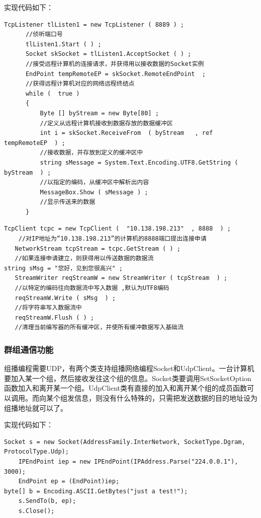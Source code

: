 \documentclass[UTF8,12pt]{article}
\begin{document}
实现代码如下：
\begin{lstlisting}[title=利用Socket来接收信息,frame=shadowbox]
    TcpListener tlListen1 = new TcpListener ( 8889 ) ;
      //侦听端口号
      tlListen1.Start ( ) ;
      Socket skSocket = tlListen1.AcceptSocket ( ) ;
      //接受远程计算机的连接请求，并获得用以接收数据的Socket实例
      EndPoint tempRemoteEP = skSocket.RemoteEndPoint  ;
      //获得远程计算机对应的网络远程终结点
      while (  true )
      {
          Byte [] byStream = new Byte[80] ;
          //定义从远程计算机接收到数据存放的数据缓冲区
          int i = skSocket.ReceiveFrom  ( byStream   , ref tempRemoteEP  ) ;
          //接收数据，并存放到定义的缓冲区中
          string sMessage = System.Text.Encoding.UTF8.GetString ( byStream  ) ;
          //以指定的编码，从缓冲区中解析出内容
          MessageBox.Show ( sMessage ) ;
          //显示传送来的数据
      }
\end{lstlisting}

\begin{lstlisting}[title=利用NetworkStream来发送信息,frame=shadowbox]
    TcpClient tcpc = new TcpClient (  "10.138.198.213"  , 8888  ) ;
    //对IP地址为“10.138.198.213”的计算机的8888端口提出连接申请
   NetworkStream tcpStream = tcpc.GetStream ( ) ;
   //如果连接申请建立，则获得用以传送数据的数据流
string sMsg = "您好，见到您很高兴" ;
   StreamWriter reqStreamW = new StreamWriter ( tcpStream  ) ;
   //以特定的编码往向数据流中写入数据 ,默认为UTF8编码
   reqStreamW.Write ( sMsg  ) ;
   //将字符串写入数据流中
   reqStreamW.Flush ( ) ;
   //清理当前编写器的所有缓冲区，并使所有缓冲数据写入基础流
\end{lstlisting}

\subsubsection{群组通信功能}
组播编程需要UDP，有两个类支持组播网络编程Socket和UdpClient。一台计算机要加入某一个组，然后接收发往这个组的信息。Socket类要调用SetSocketOption函数加入和离开某一个组。UdpClient类有直接的加入和离开某个组的成员函数可以调用。而向某个组发信息，则没有什么特殊的，只需把发送数据的目的地址设为组播地址就可以了。

实现代码如下：
\begin{lstlisting}[title=发送端,frame=shadowbox]
    Socket s = new Socket(AddressFamily.InterNetwork, SocketType.Dgram, ProtocolType.Udp);
    IPEndPoint iep = new IPEndPoint(IPAddress.Parse("224.0.0.1"), 3000);
    EndPoint ep = (EndPoint)iep;
byte[] b = Encoding.ASCII.GetBytes("just a test!");
    s.SendTo(b, ep);
    s.Close();
\end{lstlisting}
\end{document}
